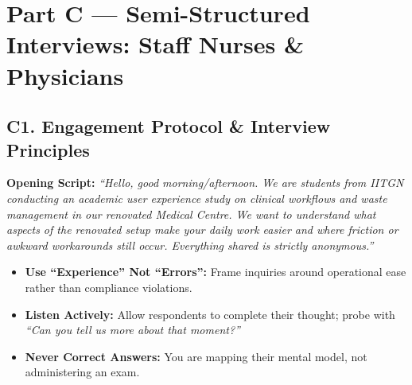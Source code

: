 \documentclass[11pt,a4paper]{article}
\begin{document}
\section{Part C --- Semi-Structured Interviews: Staff Nurses \& Physicians}

\subsection{C1. Engagement Protocol \& Interview Principles}
\begin{infobox}
\textbf{Opening Script:} \emph{``Hello, good morning/afternoon. We are students from IITGN conducting an academic user experience study on clinical workflows and waste management in our renovated Medical Centre. We want to understand what aspects of the renovated setup make your daily work easier and where friction or awkward workarounds still occur. Everything shared is strictly anonymous.''}
\end{infobox}
\begin{itemize}[leftmargin=*, nosep]
    \item \textbf{Use ``Experience'' Not ``Errors'':} Frame inquiries around operational ease rather than compliance violations.
    \item \textbf{Listen Actively:} Allow respondents to complete their thought; probe with \emph{``Can you tell us more about that moment?''}
    \item \textbf{Never Correct Answers:} You are mapping their mental model, not administering an exam.
\end{itemize}
\end{document}
